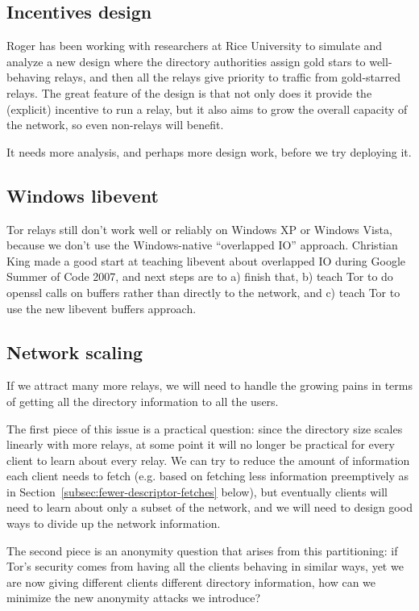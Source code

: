 \documentclass{article}
\begin{document}
\subsection{Incentives design}

Roger has been working with researchers at Rice University to simulate
and analyze a new design where the directory authorities assign gold
stars to well-behaving relays, and then all the relays give priority
to traffic from gold-starred relays. The great feature of the design is
that not only does it provide the (explicit) incentive to run a relay,
but it also aims to grow the overall capacity of the network, so even
non-relays will benefit.

It needs more analysis, and perhaps more design work, before we try
deploying it.

\subsection{Windows libevent}

Tor relays still don't work well or reliably on Windows XP or Windows
Vista, because we don't use the Windows-native ``overlapped IO''
approach. Christian King made a good start at teaching libevent about
overlapped IO during Google Summer of Code 2007, and next steps are
to a) finish that, b) teach Tor to do openssl calls on buffers rather
than directly to the network, and c) teach Tor to use the new libevent
buffers approach.

\subsection{Network scaling}

If we attract many more relays, we will need to handle the growing pains
in terms of getting all the directory information to all the users.

The first piece of this issue is a practical question: since the
directory size scales linearly with more relays, at some point it
will no longer be practical for every client to learn about every
relay. We can try to reduce the amount of information each client needs
to fetch (e.g. based on fetching less information preemptively as in
Section~\ref{subsec:fewer-descriptor-fetches} below), but eventually
clients will need to learn about only a subset of the network, and we
will need to design good ways to divide up the network information.

The second piece is an anonymity question that arises from this
partitioning: if Tor's security comes from having all the clients
behaving in similar ways, yet we are now giving different clients
different directory information, how can we minimize the new anonymity
attacks we introduce?
\end{document}
